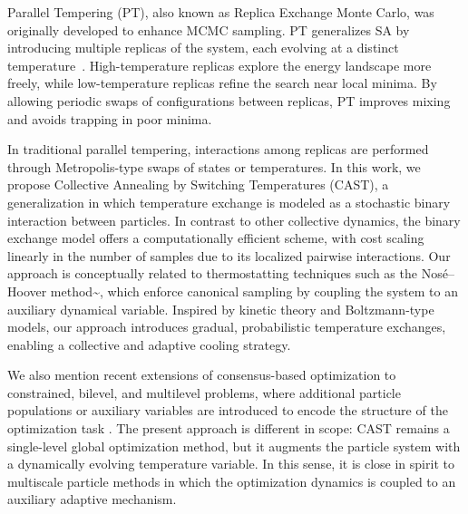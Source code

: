 \documentclass[10pt,a4paper]{article}
\theoremstyle{theorem}
\numberwithin{equation}{section}
\begin{document}
Parallel Tempering (PT), also known as Replica Exchange Monte Carlo, was originally developed to enhance MCMC sampling\cite{lelievre_computation_2007, stoltz_longtime_2018, voter_parallel_1998}. PT generalizes SA by introducing multiple replicas of the system, each evolving at a distinct temperature~\cite{geyer_markov_1991, earl_parallel_2005,marinari_simulated_1992}. High-temperature replicas explore the energy landscape more freely, while low-temperature replicas refine the search near local minima. By allowing periodic swaps of configurations between replicas, PT improves mixing and avoids trapping in poor minima.

In traditional parallel tempering, interactions among replicas are performed through Metropolis-type swaps of states or temperatures. 
In this work, we propose Collective Annealing by Switching Temperatures (CAST), a generalization in which temperature exchange is modeled as a stochastic binary interaction between particles. 
In contrast to other collective dynamics, the binary exchange model offers a computationally efficient scheme, with cost scaling linearly in the number of samples due to its localized pairwise interactions. 
Our approach is conceptually related to thermostatting techniques such as the Nosé–Hoover method^^>\cite{nose_unified_1984,hoover_canonical_1985}, which enforce canonical sampling by coupling the system to an auxiliary dynamical variable. 
Inspired by kinetic theory and Boltzmann-type models, our approach introduces gradual, probabilistic temperature exchanges, enabling a collective and adaptive cooling strategy.

We also mention recent extensions of consensus-based optimization to constrained,
bilevel, and multilevel problems, where additional particle populations or
auxiliary variables are introduced to encode the structure of the optimization
task \cite{trillos_cb2o_2025,herty_multiscale_2025}. The present approach
is different in scope: CAST remains a single-level global optimization method, but
it augments the particle system with a dynamically evolving temperature variable.
In this sense, it is close in spirit to multiscale particle methods in which the
optimization dynamics is coupled to an auxiliary adaptive mechanism.
\end{document}
